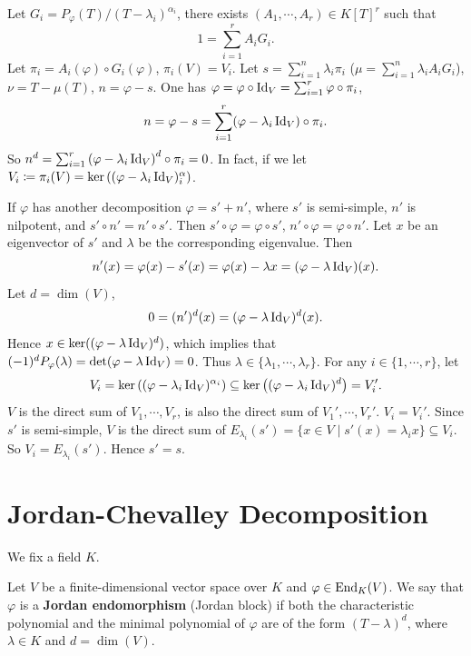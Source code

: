 \begin{proofenv}
    Let $G_i = P_{\varphi}(T)/(T - \lambda_i)^{\alpha_i}$,
    there exists $(A_1,\cdots,A_r) \in K[T]^r$ such that
    $$1 = \sum_{i=1}^{r} A_i G_i.$$
    Let $\pi_i = A_i (\varphi) \circ G_i (\varphi)$, $\pi_i (V) = V_i$.
    Let $s = \sum_{i=1}^{n} \lambda_i \pi_i$ ($\mu = \sum_{i=1}^{n}\lambda_i A_i G_i$), $\nu = T - \mu(T)$, $n = \varphi - s$.
    One has $\varphi = \varphi \circ \operatorname{\mathrm{Id}}_{V} = \sum_{i=1}^{r}\varphi \circ \pi_i$,
    $$n = \varphi - s = \sum_{i=1}^{r}(\varphi - \lambda_i \operatorname{\mathrm{Id}}_{V}) \circ \pi_{i}.$$
    So $n^d = \sum_{i=1}^{r} \left(\varphi - \lambda_i \operatorname{\mathrm{Id}}_{V}\right)^d \circ \pi_{i} = 0$.
    In fact, if we let $V_i \coloneq \pi_i (V) = \ker\left((\varphi - \lambda_i \operatorname{\mathrm{Id}}_{V})^\alpha_i\right)$.

    \quad If $\varphi$ has another decomposition $\varphi = s' + n'$, where $s'$ is semi-simple, $n'$ is nilpotent, and $s' \circ n' = n' \circ s'$.
    Then $s' \circ \varphi = \varphi \circ s'$, $n' \circ \varphi = \varphi \circ n'$.
    Let $x$ be an eigenvector of $s'$ and $\lambda$ be the corresponding eigenvalue.
    Then
    $$n'(x) = \varphi(x) - s' (x) = \varphi (x) - \lambda x = (\varphi - \lambda \operatorname{\mathrm{Id}}_{V})(x).$$
    Let $d = \dim(V)$,
    $$0 = (n')^d(x) = (\varphi - \lambda \operatorname{\mathrm{Id}}_{V})^d(x).$$
    Hence $x \in \ker((\varphi - \lambda \operatorname{\mathrm{Id}}_{V})^d)$, which implies that $(-1)^d P_{\varphi}(\lambda) = \det(\varphi - \lambda \operatorname{\mathrm{Id}}_{V}) = 0$.
    Thus $\lambda \in \{\lambda_1,\cdots,\lambda_r\}$.
    For any $i \in \{1,\cdots,r\}$, let
    $$V_i = \ker\left((\varphi - \lambda_i \operatorname{\mathrm{Id}}_{V})^{\alpha_i}\right) \subseteq \ker\left((\varphi - \lambda_i \operatorname{\mathrm{Id}}_{V})^{d}\right) = V_i'.$$
    $V$ is the direct sum of $V_1,\cdots,V_r$, is also the direct sum of $V_1',\cdots,V_r'$.
    $V_i = V_i'$.
    Since $s'$ is semi-simple, $V$ is the direct sum of $E_{\lambda_i}(s') = \{x \in V \mid s'(x) = \lambda_i x\} \subseteq V_i$.
    So $V_i = E_{\lambda_i}(s')$.
    Hence $s' = s$.
\end{proofenv}


\section{Jordan-Chevalley Decomposition}


We fix a field $K$.

\begin{definitionenv}
    Let $V$ be a finite-dimensional vector space over $K$ and $\varphi \in \operatorname{\mathrm{End}}_{K}(V)$.
    We say that $\varphi$ is a \textbf{Jordan endomorphism} (Jordan block) if both the characteristic polynomial and the minimal polynomial of $\varphi$ are of the form $(T - \lambda)^d$,
    where $\lambda \in K$ and $d = \dim(V)$.
\end{definitionenv}

